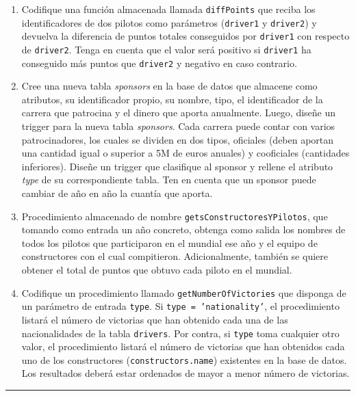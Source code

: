 \documentclass[a4paper]{article}
\begin{document}
\begin{enumerate}
    \item Codifique una función almacenada llamada \texttt{diffPoints} que reciba los identificadores de dos pilotos como parámetros (\texttt{driver1} y \texttt{driver2}) y devuelva la diferencia de puntos totales conseguidos por \texttt{driver1} con respecto de \texttt{driver2}. Tenga en cuenta que el valor será positivo si \texttt{driver1} ha conseguido más puntos que \texttt{driver2}  y negativo en caso contrario.
    
    \item Cree una nueva tabla \textit{sponsors} en la base de datos que almacene como atributos, su identificador propio, su nombre, tipo, el identificador de la carrera que patrocina y el dinero que aporta anualmente. Luego, diseñe un trigger para la nueva tabla \textit{sponsors}. Cada carrera puede contar con varios patrocinadores, los cuales se dividen en dos tipos, oficiales (deben aportan una cantidad igual o superior a 5M de euros anuales) y cooficiales (cantidades inferiores). Diseñe un trigger que clasifique al sponsor y rellene el atributo \textit{type} de su correspondiente tabla. Ten en cuenta que un sponsor puede cambiar de año en año la cuantía que aporta.

    \item Procedimiento almacenado de nombre \texttt{getsConstructoresYPilotos}, que tomando como entrada un año concreto, obtenga como salida los nombres de todos los pilotos que participaron en el mundial ese año y el equipo de constructores con el cual compitieron. Adicionalmente, también se quiere obtener el total de puntos que obtuvo cada piloto en el mundial.

    \item Codifique un procedimiento llamado \texttt{getNumberOfVictories} que disponga de un parámetro de entrada \texttt{type}. Si \texttt{type = 'nationality'}, el procedimiento listará el número de victorias que han obtenido cada una de las nacionalidades de la tabla \texttt{drivers}. Por contra, si \texttt{type} toma cualquier otro valor, el procedimiento listará el número de victorias que han obtenidos cada uno de los constructores (\texttt{constructors.name}) existentes en la base de datos. Los resultados deberá estar ordenados de mayor a menor número de victorias.
\end{enumerate}

\vspace{2em}
\hrule
\doclicenseThis
\end{document}
